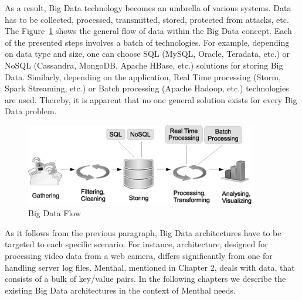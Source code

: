 As a result, Big Data technology becomes an umbrella of various systems. 
Data has to be collected, processed, transmitted, stored, protected from attacks, etc.
The Figure~\ref{fig:big_data_flow} shows the general flow of data within the Big Data concept.
Each of the presented steps involves a batch of technologies.
For example, depending on data type and size, one can choose SQL (MySQL, Oracle, Teradata, etc.) or NoSQL (Cassandra, MongoDB, Apache HBase, etc.) solutions for storing Big Data.
Similarly, depending on the application, Real Time processing (Storm, Spark Streaming, etc.) or Batch processing (Apache Hadoop, etc.) technologies are used. 
Thereby, it is apparent that no one general solution exists for every Big Data problem.

\begin{figure}
  \centering
  \includegraphics [width=0.9\textwidth]{images/big_data_flow}
  \caption{Big Data Flow}
  \label{fig:big_data_flow}
\end{figure}

As it follows from the previous paragraph, Big Data architectures have to be targeted to each specific scenario.
For instance, architecture, designed for processing video data from a web camera, differs significantly from one for handling server log files.
Menthal, mentioned in Chapter 2, deals with data, that consists of a bulk of key/value pairs. 
In the following chapters we describe the existing Big Data architectures in the context of Menthal needs.